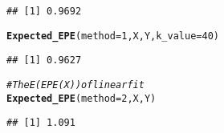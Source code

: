 \documentclass{article}\usepackage[]{graphicx}\usepackage[]{color}
\makeatletter
\newcommand{\hlnum}[1]{\textcolor[rgb]{0.686,0.059,0.569}{#1}}%
\newcommand{\hlcom}[1]{\textcolor[rgb]{0.678,0.584,0.686}{\textit{#1}}}%
\newcommand{\hlstd}[1]{\textcolor[rgb]{0.345,0.345,0.345}{#1}}%
\newcommand{\hlkwc}[1]{\textcolor[rgb]{0.333,0.667,0.333}{#1}}%
\newcommand{\hlkwd}[1]{\textcolor[rgb]{0.737,0.353,0.396}{\textbf{#1}}}%
\newenvironment{kframe}{%
 \def\at@end@of@kframe{}%
 \ifinner\ifhmode%
  \def\at@end@of@kframe{\end{minipage}}%
  \begin{minipage}{\columnwidth}%
 \fi\fi%
 \def\FrameCommand##1{\hskip\@totalleftmargin \hskip-\fboxsep
 \colorbox{shadecolor}{##1}\hskip-\fboxsep
     \hskip-\linewidth \hskip-\@totalleftmargin \hskip\columnwidth}%
 \MakeFramed {\advance\hsize-\width
   \@totalleftmargin\z@ \linewidth\hsize
   \@setminipage}}%
 {\par\unskip\endMakeFramed%
 \at@end@of@kframe}
\newenvironment{knitrout}{}{} %
\makeatother
\begin{document}
\begin{knitrout}
\begin{kframe}
\begin{alltt}
\end{alltt}
\begin{verbatim}
## [1] 0.9692
\end{verbatim}
\begin{alltt}
\hlkwd{Expected_EPE}\hlstd{(}\hlkwc{method} \hlstd{=} \hlnum{1}\hlstd{, X, Y,} \hlkwc{k_value} \hlstd{=} \hlnum{40}\hlstd{)}
\end{alltt}
\begin{verbatim}
## [1] 0.9627
\end{verbatim}
\begin{alltt}
\hlcom{# The E(EPE(X)) of linear fit}
\hlkwd{Expected_EPE}\hlstd{(}\hlkwc{method} \hlstd{=} \hlnum{2}\hlstd{, X, Y)}
\end{alltt}
\begin{verbatim}
## [1] 1.091
\end{verbatim}
\end{kframe}
\end{knitrout}
\end{document}
